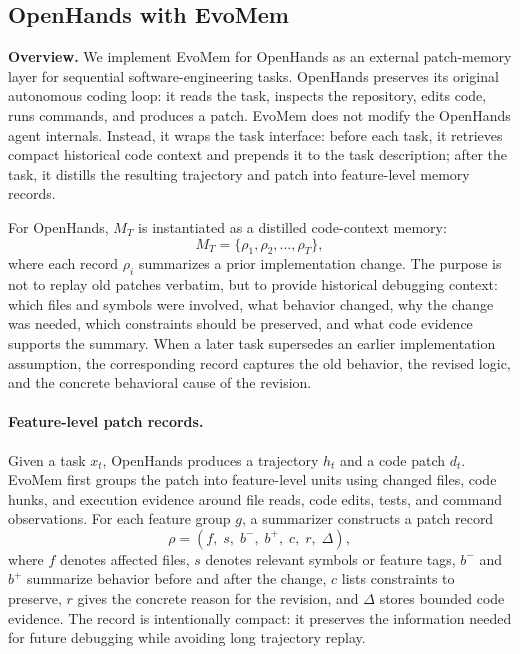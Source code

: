 \documentclass{article}
\begin{document}
\subsection{OpenHands with EvoMem}
\label{sec:evomem_openhands}

\textbf{Overview.}
We implement EvoMem for OpenHands as an external patch-memory layer for sequential software-engineering tasks. OpenHands preserves its original autonomous coding loop: it reads the task, inspects the repository, edits code, runs commands, and produces a patch. EvoMem does not modify the OpenHands agent internals. Instead, it wraps the task interface: before each task, it retrieves compact historical code context and prepends it to the task description; after the task, it distills the resulting trajectory and patch into feature-level memory records.

For OpenHands, $M_T$ is instantiated as a distilled code-context memory:
\[
M_T=\{\rho_1,\rho_2,\ldots,\rho_T\},
\]
where each record $\rho_i$ summarizes a prior implementation change. The purpose is not to replay old patches verbatim, but to provide historical debugging context: which files and symbols were involved, what behavior changed, why the change was needed, which constraints should be preserved, and what code evidence supports the summary. When a later task supersedes an earlier implementation assumption, the corresponding record captures the old behavior, the revised logic, and the concrete behavioral cause of the revision.

\paragraph{Feature-level patch records.}
Given a task $x_t$, OpenHands produces a trajectory $h_t$ and a code patch $d_t$. EvoMem first groups the patch into feature-level units using changed files, code hunks, and execution evidence around file reads, code edits, tests, and command observations. For each feature group $g$, a summarizer constructs a patch record
\[
\rho =
\left(
f,\; s,\; b^{-},\; b^{+},\; c,\; r,\; \Delta
\right),
\]
where $f$ denotes affected files, $s$ denotes relevant symbols or feature tags, $b^{-}$ and $b^{+}$ summarize behavior before and after the change, $c$ lists constraints to preserve, $r$ gives the concrete reason for the revision, and $\Delta$ stores bounded code evidence. The record is intentionally compact: it preserves the information needed for future debugging while avoiding long trajectory replay.
\end{document}
